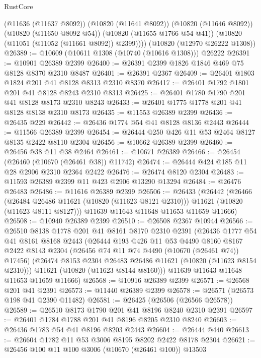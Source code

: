 \begin{lexlean}{RustCore}
\begin{coremodule}
        (@11636 (@11637 @8092))
        (@10820 (@11641 @8092))
        (@10820 (@11646 @8092))
        (@10820 (@11650 @8092 @54))
        (@10820 (@11655 @1766 @54 @41))
        (@10820 (@11051 (@11052 (@11661 @8092)) @2399))))
    (@10820 (@12970 @26222 @1308))
@26389 := @10609 (@10611 @1308 (@10740 (@10616 @1308))) @26222
@26391 := @10901 @26389 @2399
@26400 := @26391 @2399 @1826 @1846 @469 @75 @8128 @8370 @2310 @8487
@26401 := @26391 @2367
@26409 := @26401 @1803 @1824 @201 @41 @8128 @8313 @2310 @8370
@26417 := @26401 @1792 @1801 @201 @41 @8128 @8243 @2310 @8313
@26425 := @26401 @1780 @1790 @201 @41 @8128 @8173 @2310 @8243
@26433 := @26401 @1775 @1778 @201 @41 @8128 @8138 @2310 @8173
@26435 := @11553 @26389 @2399
@26436 := @26435 @229
@26442 := @26436 @1774 @54 @41 @8128 @8136 @2443
@26444 := @11566 @26389 @2399
@26454 := @26444 @250 @426 @11 @53 @2464 @8127 @8135 @2422 @8110 @2304
@26456 := @10662 @26389 @2399
@26460 := @26456 @38 @11 @38 @2464
@26461 := @10671 @26389
@26466 := @26454 (@26460 (@10670 (@26461 @38)) @11742)
@26474 := @26444 @424 @185 @11 @28 @2906 @2310 @2364 @2422
@26476 := @26474 @8120 @2304
@26483 := @11593 @26389 @2399 @11 @423 @2906 @13290 @13294
@26484 := @26476 @26483
@26486 := @11616 @26389 @2399
@26506 := @26433
    (@26442
      (@26466
        (@26484 @26486 @11621 (@10820 (@11623 @8121 @2310)))
        @11621
        (@10820 (@11623 @8111 @8127)))
      @11639
      @11643
      @11648
      @11653
      @11659
      @11666)
@26508 := @10940 @26389 @2399
@26510 := @26508 @2367 @10944
@26566 := @26510
    @8138
    @1778
    @201
    @41
    @8161
    @8170
    @2310
    @2391
    (@26436
      @1777
      @54
      @41
      @8161
      @8168
      @2443
      (@26444
        @193
        @426
        @11
        @53
        @4490
        @8160
        @8167
        @2422
        @8143
        @2304
        (@26456 @74 @11 @74 @4490 (@10670 (@26461 @74)) @17456)
        (@26474 @8153 @2304 @26483 @26486 @11621 (@10820 (@11623 @8154 @2310)))
        @11621
        (@10820 (@11623 @8144 @8160)))
      @11639
      @11643
      @11648
      @11653
      @11659
      @11666)
@26568 := @10916 @26389 @2399
@26571 := @26568 @201 @41 @2391
@26573 := @11440 @26389 @2399
@26578 := @26571 (@26573 @198 @41 @2390 @11482)
@26581 := @26425 (@26506 (@26566 @26578))
@26589 := @26510 @8173 @1790 @201 @41 @8196 @8240 @2310 @2391
@26597 := @26401 @1784 @1788 @201 @41 @8196 @8205 @2310 @8240
@26603 := @26436 @1783 @54 @41 @8196 @8203 @2443
@26604 := @26444 @440
@26613 := @26604 @1782 @11 @53 @3006 @8195 @8202 @2422 @8178 @2304
@26621 := @26456 @100 @11 @100 @3006 (@10670 (@26461 @100)) @13503

\end{coremodule}
\end{lexlean}
